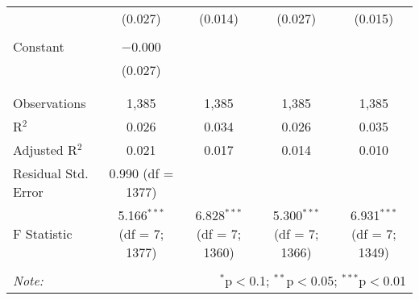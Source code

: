 \begin{table}[!htbp]
\begin{tabular}{@{\extracolsep{5pt}}lcccc}
  & (0.027) & (0.014) & (0.027) & (0.015) \\ 
  & & & & \\ 
 Constant & $-$0.000 &  &  &  \\ 
  & (0.027) &  &  &  \\ 
  & & & & \\ 
\hline \\[-1.8ex] 
Observations & 1,385 & 1,385 & 1,385 & 1,385 \\ 
R$^{2}$ & 0.026 & 0.034 & 0.026 & 0.035 \\ 
Adjusted R$^{2}$ & 0.021 & 0.017 & 0.014 & 0.010 \\ 
Residual Std. Error & 0.990 (df = 1377) &  &  &  \\ 
F Statistic & 5.166$^{***}$ (df = 7; 1377) & 6.828$^{***}$ (df = 7; 1360) & 5.300$^{***}$ (df = 7; 1366) & 6.931$^{***}$ (df = 7; 1349) \\ 
\hline 
\hline \\[-1.8ex] 
\textit{Note:}  & \multicolumn{4}{r}{$^{*}$p$<$0.1; $^{**}$p$<$0.05; $^{***}$p$<$0.01} \\ 
\end{tabular} 
\end{table} 
